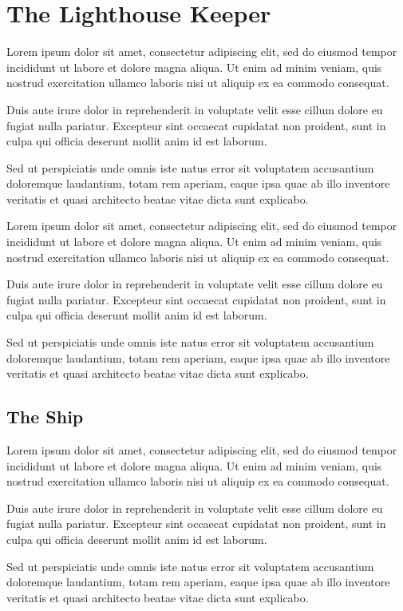 \documentclass[oneside]{memoir}
\begin{document}
\chapter{The Lighthouse Keeper}
Lorem ipsum dolor sit amet, consectetur adipiscing elit, sed do eiusmod tempor incididunt ut labore et dolore magna aliqua. Ut enim ad minim veniam, quis nostrud exercitation ullamco laboris nisi ut aliquip ex ea commodo consequat.

Duis aute irure dolor in reprehenderit in voluptate velit esse cillum dolore eu fugiat nulla pariatur. Excepteur sint occaecat cupidatat non proident, sunt in culpa qui officia deserunt mollit anim id est laborum.

Sed ut perspiciatis unde omnis iste natus error sit voluptatem accusantium doloremque laudantium, totam rem aperiam, eaque ipsa quae ab illo inventore veritatis et quasi architecto beatae vitae dicta sunt explicabo.

Lorem ipsum dolor sit amet, consectetur adipiscing elit, sed do eiusmod tempor incididunt ut labore et dolore magna aliqua. Ut enim ad minim veniam, quis nostrud exercitation ullamco laboris nisi ut aliquip ex ea commodo consequat.

Duis aute irure dolor in reprehenderit in voluptate velit esse cillum dolore eu fugiat nulla pariatur. Excepteur sint occaecat cupidatat non proident, sunt in culpa qui officia deserunt mollit anim id est laborum.

Sed ut perspiciatis unde omnis iste natus error sit voluptatem accusantium doloremque laudantium, totam rem aperiam, eaque ipsa quae ab illo inventore veritatis et quasi architecto beatae vitae dicta sunt explicabo.
\section{The Ship}
Lorem ipsum dolor sit amet, consectetur adipiscing elit, sed do eiusmod tempor incididunt ut labore et dolore magna aliqua. Ut enim ad minim veniam, quis nostrud exercitation ullamco laboris nisi ut aliquip ex ea commodo consequat.

Duis aute irure dolor in reprehenderit in voluptate velit esse cillum dolore eu fugiat nulla pariatur. Excepteur sint occaecat cupidatat non proident, sunt in culpa qui officia deserunt mollit anim id est laborum.

Sed ut perspiciatis unde omnis iste natus error sit voluptatem accusantium doloremque laudantium, totam rem aperiam, eaque ipsa quae ab illo inventore veritatis et quasi architecto beatae vitae dicta sunt explicabo.
\end{document}
